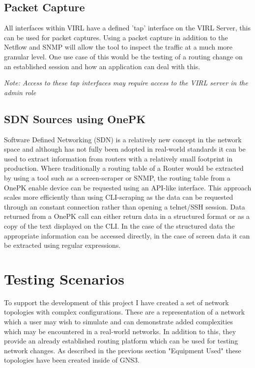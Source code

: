 \documentclass[11pt]{report}
\begin{document}
\subsection{Packet Capture}

All interfaces within VIRL have a defined 'tap' interface on the VIRL Server, this can be used for packet captures. Using a packet capture in addition to the Netflow and SNMP will allow the tool to inspect the traffic at a much more granular level. One use case of this would be the testing of a routing change on an established session and how an application can deal with this.

\textit{Note: Access to these tap interfaces may require access to the VIRL server in the admin role}

\subsection{SDN Sources using OnePK}

Software Defined Networking (SDN) is a relatively new concept in the network space and although has not fully been adopted in real-world standards it can be used to extract information from routers with a relatively small footprint in production. Where traditionally a routing table of a Router would be extracted by using a tool such as a screen-scraper or SNMP, the routing table from a OnePK enable device can be requested using an API-like interface. This approach scales more efficiently than using CLI-scraping as the data can be requested through an constant connection rather than opening a telnet/SSH session. Data returned from a OnePK call can either return data in a structured format or as a copy of the text displayed on the CLI. In the case of the structured data the appropriate information can be accessed directly, in the case of screen data it can be extracted using regular expressions.
 

\section{Testing Scenarios}

To support the development of this project I have created a set of network topologies with complex configurations. These are a representation of a network which a user may wish to simulate and can demonstrate added complexities which may be encountered in a real-world networks. In addition to this, they provide an already established routing platform which can be used for testing network changes. As described in the previous section "Equipment Used" these topologies have been created inside of GNS3.
\end{document}
